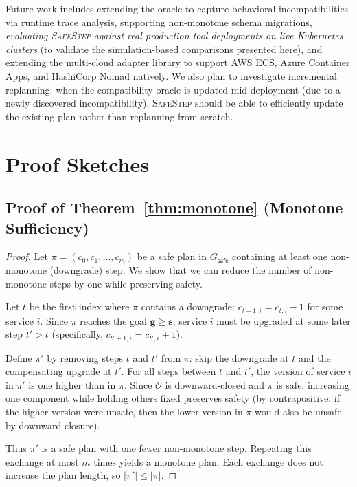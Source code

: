 \documentclass[10pt,twocolumn]{article}
\newcommand{\safestep}{\textsc{SafeStep}}
\begin{document}
Future work includes extending the oracle to
capture behavioral incompatibilities via runtime trace analysis,
supporting non-monotone schema migrations, \emph{evaluating
\safestep{} against real production tool deployments on live
Kubernetes clusters} (to validate the simulation-based comparisons
presented here), and extending the
multi-cloud adapter library to support AWS ECS, Azure
Container Apps, and HashiCorp Nomad natively. We also plan to
investigate incremental replanning: when the compatibility
oracle is updated mid-deployment (due to a newly discovered
incompatibility), \safestep{} should be able to efficiently
update the existing plan rather than replanning from scratch.

\appendix
\section{Proof Sketches}
\label{app:proofs}

\subsection{Proof of Theorem~\ref{thm:monotone} (Monotone Sufficiency)}

\begin{proof}
Let $\pi = (c_0, c_1, \ldots, c_m)$ be a safe plan in
$G_{\mathsf{safe}}$ containing at least one non-monotone
(downgrade) step. We show that we can reduce the number of
non-monotone steps by one while preserving safety.

Let $t$ be the first index where $\pi$ contains a downgrade:
$c_{t+1,i} = c_{t,i} - 1$ for some service $i$. Since $\pi$
reaches the goal $\mathbf{g} \geq \mathbf{s}$, service $i$
must be upgraded at some later step $t' > t$ (specifically,
$c_{t'+1,i} = c_{t',i} + 1$).

Define $\pi'$ by removing steps $t$ and $t'$ from $\pi$: skip
the downgrade at $t$ and the compensating upgrade at $t'$.
For all steps between $t$ and $t'$, the version of service $i$
in $\pi'$ is one higher than in $\pi$. Since $\mathcal{O}$ is
downward-closed and $\pi$ is safe, increasing one component
while holding others fixed preserves safety (by contrapositive:
if the higher version were unsafe, then the lower version in
$\pi$ would also be unsafe by downward closure).

Thus $\pi'$ is a safe plan with one fewer non-monotone step.
Repeating this exchange at most $m$ times yields a monotone
plan. Each exchange does not increase the plan length, so
$|\pi'| \leq |\pi|$.
\end{proof}
\end{document}
